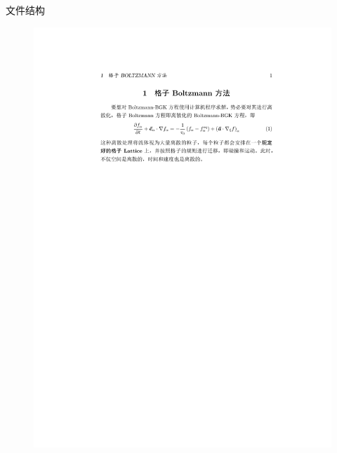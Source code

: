 \begin{frame}{文件结构}
    \begin{figure}
        \centering
        \includegraphics[scale=0.7]{figures/test2.pdf}
    \end{figure}
\end{frame}

